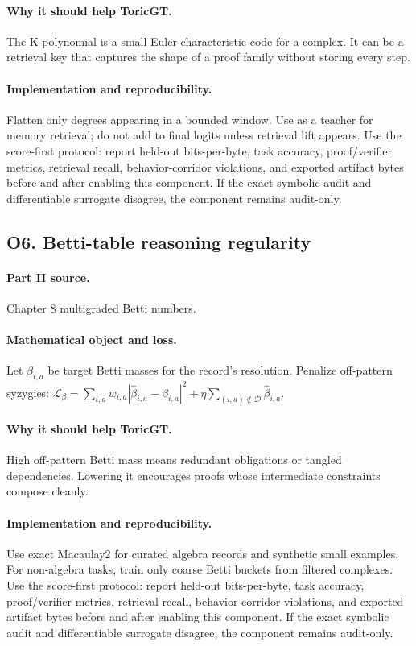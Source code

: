 \documentclass[11pt]{article}
\theoremstyle{definition}
\begin{document}
\paragraph{Why it should help ToricGT.} The K-polynomial is a small Euler-characteristic code for a complex.  It can be a retrieval key that captures the shape of a proof family without storing every step.
\paragraph{Implementation and reproducibility.} Flatten only degrees appearing in a bounded window.  Use as a teacher for memory retrieval; do not add to final logits unless retrieval lift appears.  Use the score-first protocol: report held-out bits-per-byte, task accuracy, proof/verifier metrics, retrieval recall, behavior-corridor violations, and exported artifact bytes before and after enabling this component.  If the exact symbolic audit and differentiable surrogate disagree, the component remains audit-only.


\subsection{O6. Betti-table reasoning regularity}
\paragraph{Part II source.} Chapter 8 multigraded Betti numbers.
\paragraph{Mathematical object and loss.} Let $\beta_{i,a}$ be target Betti masses for the record's resolution.  Penalize off-pattern syzygies: $\mathcal L_\beta=\sum_{i,a}w_{i,a}|\hat\beta_{i,a}-\beta_{i,a}|^2+\eta\sum_{(i,a)\notin\mathcal D}\hat\beta_{i,a}$.
\paragraph{Why it should help ToricGT.} High off-pattern Betti mass means redundant obligations or tangled dependencies.  Lowering it encourages proofs whose intermediate constraints compose cleanly.
\paragraph{Implementation and reproducibility.} Use exact Macaulay2 for curated algebra records and synthetic small examples.  For non-algebra tasks, train only coarse Betti buckets from filtered complexes.  Use the score-first protocol: report held-out bits-per-byte, task accuracy, proof/verifier metrics, retrieval recall, behavior-corridor violations, and exported artifact bytes before and after enabling this component.  If the exact symbolic audit and differentiable surrogate disagree, the component remains audit-only.
\end{document}
